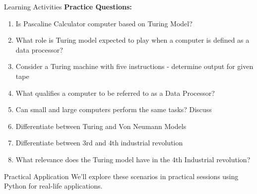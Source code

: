 \documentclass[aspectratio=169]{beamer}
\begin{document}
\begin{frame}{Learning Activities}
    \textbf{Practice Questions:}
    \begin{enumerate}
        \item Is Pascaline Calculator computer based on Turing Model?
        \item What role is Turing model expected to play when a computer is defined as a data processor?
        \item Consider a Turing machine with five instructions - determine output for given tape
        \item What qualifies a computer to be referred to as a Data Processor?
        \item Can small and large computers perform the same tasks? Discuss
        \item Differentiate between Turing and Von Neumann Models
        \item Differentiate between 3rd and 4th industrial revolution
        \item What relevance does the Turing model have in the 4th Industrial revolution?
    \end{enumerate}
    
    \vspace{0.3cm}
    \begin{exampleblock}{Practical Application}
        We'll explore these scenarios in practical sessions using Python for real-life applications.
    \end{exampleblock}
\end{frame}
\end{document}
